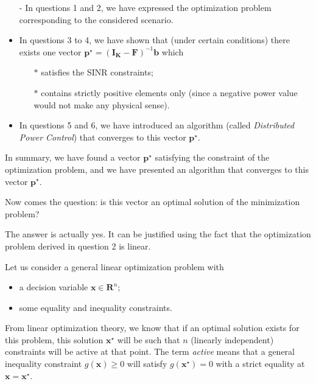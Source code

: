 \documentclass [a4paper, 11pt] {article}
\begin{document}
\begin{solution}
\begin{enumerate}
    \begin{itemize}
        \item[-] In questions 1 and 2, we have expressed the optimization problem corresponding to the considered scenario.
        \item In questions 3 to 4, we have shown that (under certain conditions) there exists one vector $\mathbf{p}^\star = (\mathbf{I_K} - \mathbf{F})^{-1}\mathbf{b}$ which
        \begin{itemize}
            \item[$\ast$] satisfies the SINR constraints;
            \item[$\ast$] contains strictly positive elements only (since a negative power value would not make any physical sense).
        \end{itemize}
         \item In questions 5 and 6, we have introduced an algorithm (called \textit{Distributed Power Control}) that converges to this vector $\mathbf{p}^\star$.
    \end{itemize}

    In summary, we have found a vector $\mathbf{p}^\star$ satisfying the constraint of the optimization problem, and we have presented an algorithm that converges to this vector $\mathbf{p}^\star$.

    Now comes the question: is this vector an optimal solution of the minimization problem?

    The answer is actually yes. It can be justified using the fact that the optimization problem derived in question 2 is linear.

    Let us consider a general linear optimization problem with
    \begin{itemize}
        \item a decision variable $\mathbf{x} \in \mathbf{R}^n$;
        \item some equality and inequality constraints.
    \end{itemize}



    \newpage



    From linear optimization theory, we know that if an optimal solution exists for this problem, this solution $\mathbf{x}^\star$ will be such that $n$ (linearly independent) constraints will be active at that point. The term \textit{active} means that a general inequality constraint $g(\mathbf{x}) \geq 0$ will satisfy $g(\mathbf{x}^\star) = 0$ with a strict equality at $\mathbf{x} = \mathbf{x}^\star$.


\end{enumerate}
\end{solution}
\end{document}
